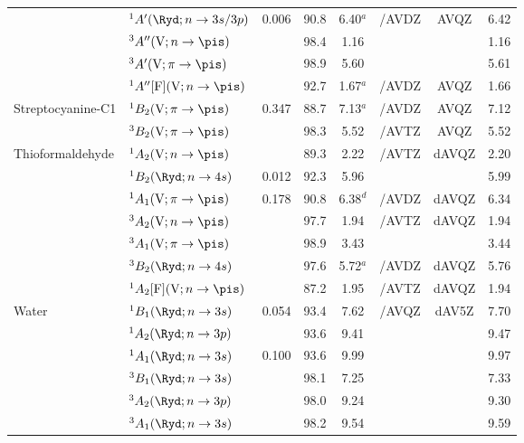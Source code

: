 \begin{tabular}{llcccccc}
        &$^1A' (\Ryd;n \rightarrow 3s/3p)$ 						&0.006	&90.8 &6.40$^a$	&{\exCI}/AVDZ	& AVQZ		&6.42 	\\
        &$^3A'' (\mathrm{V};n \rightarrow \pis)$					&		&98.4 &1.16		&			&			&1.16 	\\
        &$^3A' (\mathrm{V};\pi \rightarrow \pis)$					&		&98.9 &5.60		&			&			&5.61	\\
        &$^1A'' [\mathrm{F}]	(\mathrm{V};n \rightarrow \pis)$			&		&92.7&1.67$^a$	&{\exCI}/AVDZ	& AVQZ		&1.66	\\
  Streptocyanine-C1&$^1B_2 (\mathrm{V};\pi \rightarrow \pis)$ 				& 0.347	&88.7&7.13$^a$	& {\exCI}/AVDZ & AVQZ		&7.12	\\
        &	$^3B_2 (\mathrm{V};\pi \rightarrow \pis)$ 				& 		&98.3 &5.52		& {\exCI}/AVTZ & AVQZ		&5.52	 \\
  Thioformaldehyde&$^1A_2 (\mathrm{V};n \rightarrow \pis)$ 				&		&89.3 &2.22		&  {\exCI}/AVTZ & dAVQZ		&2.20	\\
        &$^1B_2 (\Ryd;n \rightarrow 4s)$ 						& 0.012	&92.3 &5.96		&			&			&5.99	\\
        &$^1A_1 (\mathrm{V};\pi \rightarrow \pis)$				& 0.178	&90.8 &6.38$^d$	&{\CCSDTQ}/AVDZ& dAVQZ	&6.34	\\
        &$^3A_2 (\mathrm{V};n \rightarrow \pis)$ 					&		&97.7 &1.94		&{\exCI}/AVTZ & dAVQZ		&1.94	\\
        &$^3A_1 (\mathrm{V};\pi \rightarrow \pis)$				&		&98.9 & 3.43		&			&			&3.44	\\
        &$^3B_2 (\Ryd;n \rightarrow 4s)$ 						&		&97.6 &5.72$^a$	&{\exCI}/AVDZ& dAVQZ		&5.76	\\
        &$^1A_2 [\mathrm{F}] (\mathrm{V};n \rightarrow \pis)$		&		&87.2 &1.95		&{\exCI}/AVTZ & dAVQZ		&1.94	\\
  Water		& $^1B_1 (\Ryd; n \rightarrow 3s)$ 						& 0.054	&93.4 &7.62		& {\exCI}/AVQZ&dAV5Z 		&7.70	 \\
        & $^1A_2 (\Ryd; n \rightarrow 3p)$ 						& 		&93.6 &9.41		&			&			&9.47 	 \\	
        & $^1A_1 (\Ryd; n \rightarrow 3s)$ 						& 0.100	&93.6 &9.99		&			&			&9.97	 \\	
        & $^3B_1 (\Ryd; n \rightarrow 3s)$ 						& 		&98.1 &7.25		&			&			&7.33	 \\	
        & $^3A_2 (\Ryd; n \rightarrow 3p)$ 						& 		&98.0 &9.24 		&			&			&9.30	 \\	
        & $^3A_1 (\Ryd; n \rightarrow 3s)$ 						& 		&98.2 &9.54		&			&			&9.59	 \\	
\end{tabular}